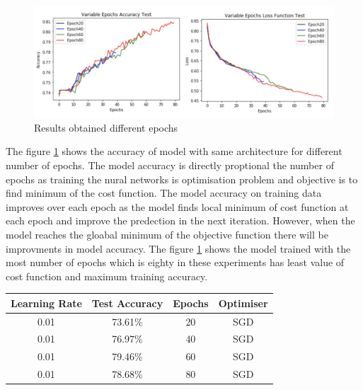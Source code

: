 \begin{figure}[!htp]
    \includegraphics[width=\textwidth]{Images/epochs.png}
    \caption{Results obtained different epochs}
    \label{fig:epochsTest}
\end{figure}

The figure \ref{fig:epochsTest} shows the accuracy of model with same architecture for 
different number of epochs. The model accuracy is directly proptional the number of epochs as 
training the nural networks is optimisation problem and objective is to find minimum of the cost 
function. The model accuracy on training data improves over each epoch as the model finds 
local minimum of cost function at each epoch and improve the predection in the next iteration.
However, when the model reaches the gloabal minimum of the objective function there will 
be improvments in model accuracy. The figure \ref{fig:epochsTest} shows the model trained 
with the most number of epochs which is eighty in these experiments has least value of 
cost function and maximum training accuracy.

\pagebreak


\begin{center}
    \begin{tabular} { | c | c | c | c |}
        \hline
        Learning Rate & Test Accuracy & Epochs  & Optimiser\\ 
        \hline
        0.01 & 73.61\% & 20 & SGD \\ 
        \hline 
        0.01 & 76.97\% & 40 & SGD  \\
        \hline 
        0.01 & 79.46\% & 60 & SGD \\
        \hline
        0.01 & 78.68\% & 80 & SGD \\
        \hline
    \end{tabular}
\end{center}